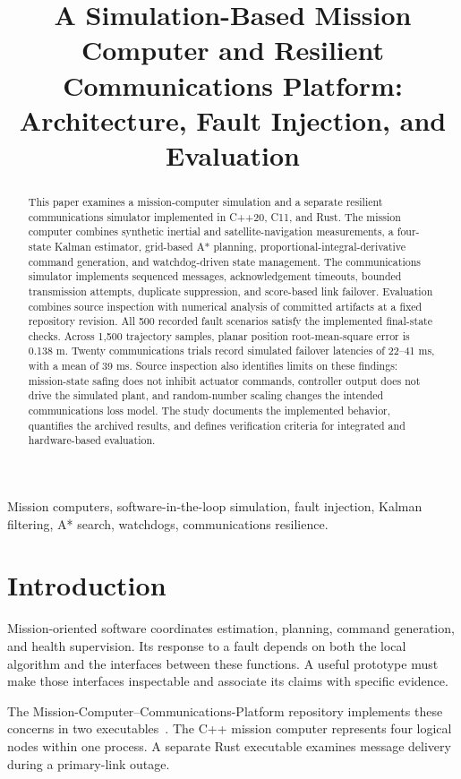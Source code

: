 \documentclass[conference]{IEEEtran}
\title{A Simulation-Based Mission Computer and Resilient
Communications Platform:\\
Architecture, Fault Injection, and Evaluation}
\author{
  \IEEEauthorblockN{Tyree Franklin Jr.}
  \IEEEauthorblockA{
    Computer Science Student\\
    Western Governors University\\
    \url{https://github.com/tyreefranklinjr}
  }
}
\begin{document}
\maketitle

\begin{abstract}
This paper examines a mission-computer simulation and a separate
resilient communications simulator implemented in C++20, C11,
and Rust. The mission computer combines synthetic inertial and
satellite-navigation measurements, a four-state Kalman estimator,
grid-based A* planning, proportional-integral-derivative command
generation, and watchdog-driven state management. The
communications simulator implements sequenced messages,
acknowledgement timeouts, bounded transmission attempts,
duplicate suppression, and score-based link failover.
Evaluation combines source inspection with numerical analysis
of committed artifacts at a fixed repository revision.
All 500 recorded fault scenarios satisfy the implemented
final-state checks. Across 1,500 trajectory samples, planar
position root-mean-square error is 0.138 m. Twenty communications
trials record simulated failover latencies of 22--41 ms, with
a mean of 39 ms. Source inspection also identifies limits on
these findings: mission-state safing does not inhibit actuator
commands, controller output does not drive the simulated plant,
and random-number scaling changes the intended communications
loss model. The study documents the implemented behavior,
quantifies the archived results, and defines verification
criteria for integrated and hardware-based evaluation.
\end{abstract}

\begin{IEEEkeywords}
Mission computers, software-in-the-loop simulation, fault
injection, Kalman filtering, A* search, watchdogs,
communications resilience.
\end{IEEEkeywords}

\section{Introduction}

Mission-oriented software coordinates estimation, planning,
command generation, and health supervision. Its response to
a fault depends on both the local algorithm and the interfaces
between these functions. A useful prototype must make those
interfaces inspectable and associate its claims with specific
evidence.

The Mission-Computer--Communications-Platform repository
implements these concerns in two executables~\cite{repo}.
The C++ mission computer represents four logical nodes within
one process. A separate Rust executable examines message
delivery during a primary-link outage.
\end{document}
